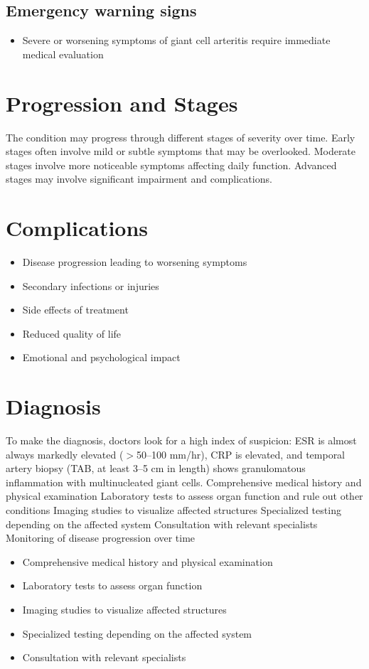 \subsection{Emergency warning signs}
\begin{itemize}[noitemsep]
  \item Severe or worsening symptoms of giant cell arteritis require immediate medical evaluation
\end{itemize}
\section{Progression and Stages}
The condition may progress through different stages of severity over time. Early stages often involve mild or subtle symptoms that may be overlooked. Moderate stages involve more noticeable symptoms affecting daily function. Advanced stages may involve significant impairment and complications.
\section{Complications}
\begin{itemize}[noitemsep]
  \item Disease progression leading to worsening symptoms
  \item Secondary infections or injuries
  \item Side effects of treatment
  \item Reduced quality of life
  \item Emotional and psychological impact
\end{itemize}
\section{Diagnosis}
To make the diagnosis, doctors look for a high index of suspicion: ESR is almost always markedly elevated ($>$50--100 mm/hr), CRP is elevated, and temporal artery biopsy (TAB, at least 3--5 cm in length) shows granulomatous inflammation with multinucleated giant cells. Comprehensive medical history and physical examination Laboratory tests to assess organ function and rule out other conditions Imaging studies to visualize affected structures Specialized testing depending on the affected system Consultation with relevant specialists Monitoring of disease progression over time

\begin{itemize}[noitemsep]
  \item Comprehensive medical history and physical examination
  \item Laboratory tests to assess organ function
  \item Imaging studies to visualize affected structures
  \item Specialized testing depending on the affected system
  \item Consultation with relevant specialists
\end{itemize}
